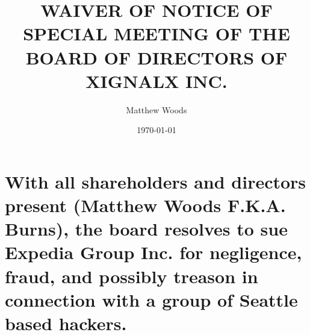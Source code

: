 \documentclass{article}
\title{WAIVER OF NOTICE OF SPECIAL MEETING OF THE BOARD OF DIRECTORS OF XIGNALX INC.}
\author{Matthew Woods}
\date{\today}
\begin{document}
\maketitle

\section{With all shareholders and directors present (Matthew Woods F.K.A. Burns), the board resolves to sue Expedia Group Inc. for negligence, fraud, and possibly treason in connection with a group of Seattle based hackers.}
\end{document}
